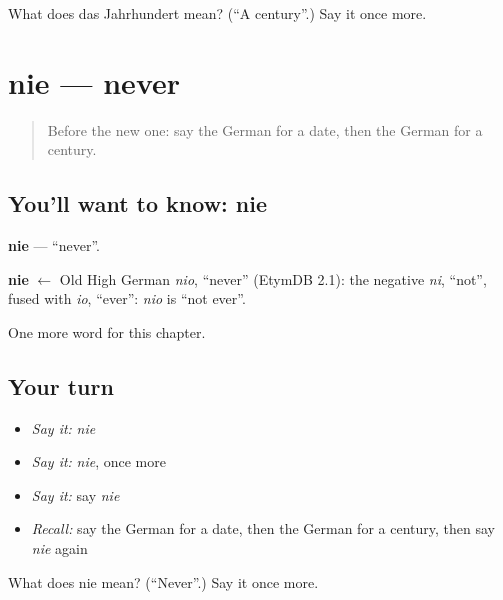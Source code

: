\begin{tcolorbox}[breakable,colback=teal!4,colframe=teal!35!black,title={Before you move on}]
What does das Jahrhundert mean? (\textquotedblleft{}A century\textquotedblright{}.) Say it once more.
\end{tcolorbox}
\section[nie]{nie — never}

\label{lesson:GE-C137-nie}



\begin{quote}
Before the new one: say the German for a date, then the German for a century.
\end{quote}

\subsection*{You'll want to know: nie}
\textbf{nie} — \textquotedblleft{}never\textquotedblright{}.

\begin{cousinweb}
\textbf{nie} $\leftarrow$ Old High German \emph{nio}, \textquotedblleft{}never\textquotedblright{} (EtymDB 2.1): the negative \emph{ni}, \textquotedblleft{}not\textquotedblright{}, fused with \emph{io}, \textquotedblleft{}ever\textquotedblright{}: \emph{nio} is \textquotedblleft{}not ever\textquotedblright{}.
\end{cousinweb}

\begin{grammarlens}[title={What you've built}]
One more word for this chapter.
\end{grammarlens}

\subsection*{Your turn}
\begin{itemize}
\raggedright
  \item \emph{Say it:} \emph{nie}
  \item \emph{Say it:} \emph{nie}, once more
  \item \emph{Say it:} say \emph{nie}
  \item \emph{Recall:} say the German for a date, then the German for a century, then say \emph{nie} again
\end{itemize}

\begin{tcolorbox}[breakable,colback=teal!4,colframe=teal!35!black,title={Before you move on}]
What does nie mean? (\textquotedblleft{}Never\textquotedblright{}.) Say it once more.
\end{tcolorbox}
